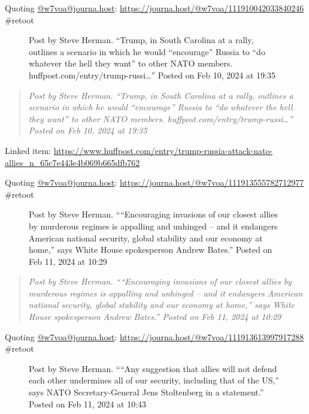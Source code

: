 Quoting \href{https://journa.host/@w7voa/}{@w7voa@journa.host}:
\url{https://journa.host/@w7voa/111910042033840246} \#retoot

\begin{figure}
\centering
{}
\caption{Post by Steve Herman. ``Trump, in South Carolina at a rally,
outlines a scenario in which he would ``encourage'' Russia to ``do
whatever the hell they want'' to other NATO members.
huffpost.com/entry/trump-russi\ldots'' Posted on Feb 10, 2024 at 19:35}
\end{figure}

\begin{quote}
\emph{Post by Steve Herman. ``Trump, in South Carolina at a rally,
outlines a scenario in which he would ``encourage'' Russia to ``do
whatever the hell they want'' to other NATO members.
huffpost.com/entry/trump-russi\ldots'' Posted on Feb 10, 2024 at 19:35}
\end{quote}

Linked item:
\url{https://www.huffpost.com/entry/trump-russia-attack-nato-allies_n_65c7e443e4b069b665dfb762}

Quoting \href{https://journa.host/@w7voa/}{@w7voa@journa.host}:
\url{https://journa.host/@w7voa/111913555782712977} \#retoot

\begin{figure}
\centering
{}
\caption{Post by Steve Herman. ````Encouraging invasions of our closest
allies by murderous regimes is appalling and unhinged -- and it
endangers American national security, global stability and our economy
at home,'' says White House spokesperson Andrew Bates.'' Posted on Feb
11, 2024 at 10:29}
\end{figure}

\begin{quote}
\emph{Post by Steve Herman. ````Encouraging invasions of our closest
allies by murderous regimes is appalling and unhinged -- and it
endangers American national security, global stability and our economy
at home,'' says White House spokesperson Andrew Bates.'' Posted on Feb
11, 2024 at 10:29}
\end{quote}

Quoting \href{https://journa.host/@w7voa/}{@w7voa@journa.host}:
\url{https://journa.host/@w7voa/111913613997917288} \#retoot

\begin{figure}
\centering
{}
\caption{Post by Steve Herman. ````Any suggestion that allies will not
defend each other undermines all of our security, including that of the
US,'' says NATO Secretary-General Jens Stoltenberg in a statement.''
Posted on Feb 11, 2024 at 10:43}
\end{figure}

